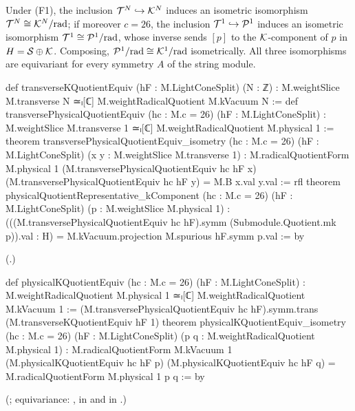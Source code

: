\begin{theorem}\label{ch18:thm:quotientequivs}
Under (F1), the inclusion $\mathcal{T}^N\hookrightarrow\mathcal{K}^N$ induces an isometric isomorphism
$\mathcal{T}^N\cong\mathcal{K}^N/\mathrm{rad}$; if moreover $c=26$, the inclusion $\mathcal{T}^1\hookrightarrow\mathcal{P}^1$ induces an isometric
isomorphism $\mathcal{T}^1\cong\mathcal{P}^1/\mathrm{rad}$, whose inverse sends $[p]$ to the $\mathcal{K}$-component of $p$ in
$H=\mathcal{S}\oplus\mathcal{K}$.  Composing, $\mathcal{P}^1/\mathrm{rad}\cong\mathcal{K}^1/\mathrm{rad}$ isometrically.  All three isomorphisms are equivariant for
every symmetry $A$ of the string module.
\end{theorem}
\begin{leancode}
def transverseKQuotientEquiv (hF : M.LightConeSplit) (N : ℤ) :
    M.weightSlice M.transverse N ≃ₗ[ℂ] M.weightRadicalQuotient M.kVacuum N :=
def transversePhysicalQuotientEquiv (hc : M.c = 26) (hF : M.LightConeSplit) :
    M.weightSlice M.transverse 1 ≃ₗ[ℂ] M.weightRadicalQuotient M.physical 1 :=
theorem transversePhysicalQuotientEquiv_isometry (hc : M.c = 26) (hF : M.LightConeSplit)
    (x y : M.weightSlice M.transverse 1) :
    M.radicalQuotientForm M.physical 1 (M.transversePhysicalQuotientEquiv hc hF x)
      (M.transversePhysicalQuotientEquiv hc hF y) = M.B x.val y.val := rfl
theorem physicalQuotientRepresentative_kComponent (hc : M.c = 26) (hF : M.LightConeSplit)
    (p : M.weightSlice M.physical 1) :
    (((M.transversePhysicalQuotientEquiv hc hF).symm
      (Submodule.Quotient.mk p)).val : H) =
      M.kVacuum.projection M.spurious hF.symm p.val := by
\end{leancode}
(.)
\begin{leancode}
def physicalKQuotientEquiv (hc : M.c = 26) (hF : M.LightConeSplit) :
    M.weightRadicalQuotient M.physical 1 ≃ₗ[ℂ] M.weightRadicalQuotient M.kVacuum 1 :=
  (M.transversePhysicalQuotientEquiv hc hF).symm.trans (M.transverseKQuotientEquiv hF 1)
theorem physicalKQuotientEquiv_isometry (hc : M.c = 26) (hF : M.LightConeSplit)
    (p q : M.weightRadicalQuotient M.physical 1) :
    M.radicalQuotientForm M.kVacuum 1 (M.physicalKQuotientEquiv hc hF p)
      (M.physicalKQuotientEquiv hc hF q) = M.radicalQuotientForm M.physical 1 p q := by
\end{leancode}
(; equivariance:
,  in
 and
 in
.)

